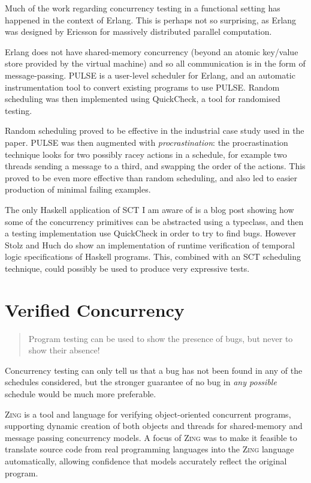 Much of the work regarding concurrency testing in a functional setting
has happened in the context of Erlang. This is perhaps not so
surprising, as Erlang was designed by Ericsson for massively
distributed parallel computation.

Erlang does not have shared-memory concurrency (beyond an atomic
key/value store provided by the virtual machine) and so all
communication is in the form of message-passing. PULSE\cite{pulse} is
a user-level scheduler for Erlang, and an automatic instrumentation
tool to convert existing programs to use PULSE. Random scheduling was
then implemented using QuickCheck, a tool for randomised testing.

Random scheduling proved to be effective in the industrial case study
used in the paper. PULSE was then augmented with
\textit{procrastination}: the procrastination technique looks for two
possibly racey actions in a schedule, for example two threads sending
a message to a third, and swapping the order of the actions. This
proved to be even more effective than random scheduling, and also led
to easier production of minimal failing examples.

The only Haskell application of SCT I am aware of is a blog
post\cite{typeclass} showing how some of the concurrency primitives
can be abstracted using a typeclass, and then a testing implementation
use QuickCheck in order to try to find bugs. However Stolz and Huch do
show an implementation of runtime verification of temporal logic
specifications of Haskell programs\cite{rvhaskell}. This, combined
with an SCT scheduling technique, could possibly be used to produce
very expressive tests.

\section{Verified Concurrency}
\label{sec:litref-verify}

\begin{quote}
  Program testing can be used to show the presence of bugs, but never
  to show their absence!

\end{quote}

Concurrency testing can only tell us that a bug has not been found in
any of the schedules considered, but the stronger guarantee of no bug
in \textit{any possible} schedule would be much more preferable.

\textsc{Zing}\cite{zing} is a tool and language for verifying
object-oriented concurrent programs, supporting dynamic creation of
both objects and threads for shared-memory and message passing
concurrency models. A focus of \textsc{Zing} was to make it feasible
to translate source code from real programming languages into the
\textsc{Zing} language automatically, allowing confidence that models
accurately reflect the original program.

